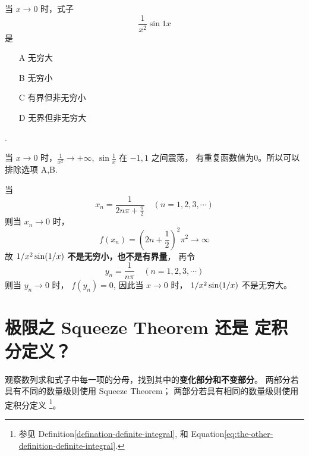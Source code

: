 \begin{example}
    当 $x \to 0$ 时，式子
    \[
        \frac{1}{x^2} \sin {1}{x}
    \]
    是
    \begin{enumerate}
        \item[A] 无穷大
        \item[B] 无穷小
        \item[C] 有界但非无穷小
        \item[D] 无界但非无穷大
    \end{enumerate}

    \cite[page 1, question 5]{ll}.

    当 $x \to 0$ 时，$\frac{1}{x^2} \to +\infty$, $\sin \frac{1}{x}$ 在 $-1, 1$ 之间震荡，
    有重复函数值为0。所以可以排除选项 A,B.

    当
    \[
        x_n = \frac{1}{2n \pi + \frac{\pi}{2}} \quad (n = 1, 2, 3, \cdots)
    \]
    则当 $x_n \to 0$ 时，
    \[
        f(x_n) = \left(2n + \frac{1}{2}\right)^2 \pi^2 \to \infty
    \]
    故 $\cramped{1/{x^2} \sin (1/{x})}$ \textbf{不是无穷小，也不是有界量}，
    再令 
    \[
        y_n = \frac{1}{n \pi} \quad (n = 1, 2, 3, \cdots)
    \]
    则当 $y_n \to 0$ 时， $f(y_n) = 0$, 因此当 $x \to 0$ 时，
    $\cramped{1/{x^2} \sin (1/{x})}$ 不是无穷大。
\end{example}

\section{极限之 Squeeze Theorem 还是 定积分定义？}
\label{use-squeeze-or-definition-of-integral}

观察数列求和式子中每一项的分母，找到其中的\textbf{变化部分和不变部分}。
两部分若具有不同的数量级则使用 Squeeze Theorem；
两部分若具有相同的数量级则使用 定积分定义
\footnote{
    参见 Definition\ref{defination-definite-integral},
    和 Equation\ref{eq:the-other-definition-definite-integral}.
}。

